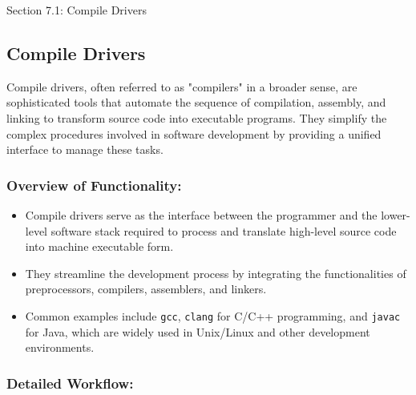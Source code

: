 \begin{notes}{Section 7.1: Compile Drivers}
    \subsection*{Compile Drivers}

    Compile drivers, often referred to as "compilers" in a broader sense, are sophisticated tools that automate the sequence of compilation, assembly, and linking to transform source code into executable 
    programs. They simplify the complex procedures involved in software development by providing a unified interface to manage these tasks. \vspace*{1em}
    
    \subsubsection*{Overview of Functionality:}
    
    \begin{itemize}
        \item Compile drivers serve as the interface between the programmer and the lower-level software stack required to process and translate high-level source code into machine executable form.
        \item They streamline the development process by integrating the functionalities of preprocessors, compilers, assemblers, and linkers.
        \item Common examples include \texttt{gcc}, \texttt{clang} for C/C++ programming, and \texttt{javac} for Java, which are widely used in Unix/Linux and other development environments.
    \end{itemize}
    
    \subsubsection*{Detailed Workflow:}
    

\end{notes}
